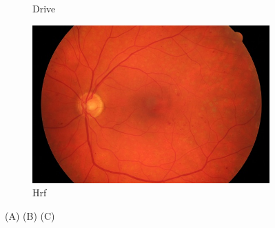 \begin{figure}[H]
\begin{subfigure}[b]{0.1\textwidth}
        \caption{Drive}
        \label{fig:Drive}
    \end{subfigure}
    \begin{subfigure}[b]{0.1\textwidth}
				\centering
        \includegraphics[height=2\textwidth]{./Figures/imagesHRF.png}\hspace{10mm}
        \caption{Hrf}
        \label{fig:Hrf}
    \end{subfigure}        
    \label{fig:Imagenes de fondo de ojo}
    \caption{(A) (B) (C)}
\end{figure}


